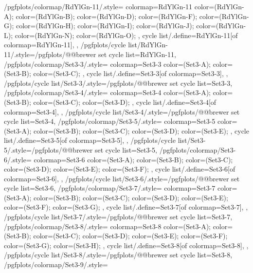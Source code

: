 {  %
  /pgfplots/colormap/RdYlGn-11/.style={
    colormap={RdYlGn-11}{
      color=(RdYlGn-A);
      color=(RdYlGn-B);
      color=(RdYlGn-D);
      color=(RdYlGn-F);
      color=(RdYlGn-G);
      color=(RdYlGn-H);
      color=(RdYlGn-I);
      color=(RdYlGn-J);
      color=(RdYlGn-L);
      color=(RdYlGn-N);
      color=(RdYlGn-O);
    },
    cycle list/.define={RdYlGn-11}{[of colormap=RdYlGn-11]},
  },
  /pgfplots/cycle list/RdYlGn-11/.style={/pgfplots/@@brewer set cycle list={RdYlGn-11}},
  /pgfplots/colormap/Set3-3/.style={
    colormap={Set3-3}{
      color=(Set3-A);
      color=(Set3-B);
      color=(Set3-C);
    },
    cycle list/.define={Set3-3}{[of colormap=Set3-3]},
  },
  /pgfplots/cycle list/Set3-3/.style={/pgfplots/@@brewer set cycle list={Set3-3}},
  /pgfplots/colormap/Set3-4/.style={
    colormap={Set3-4}{
      color=(Set3-A);
      color=(Set3-B);
      color=(Set3-C);
      color=(Set3-D);
    },
    cycle list/.define={Set3-4}{[of colormap=Set3-4]},
  },
  /pgfplots/cycle list/Set3-4/.style={/pgfplots/@@brewer set cycle list={Set3-4}},
  /pgfplots/colormap/Set3-5/.style={
    colormap={Set3-5}{
      color=(Set3-A);
      color=(Set3-B);
      color=(Set3-C);
      color=(Set3-D);
      color=(Set3-E);
    },
    cycle list/.define={Set3-5}{[of colormap=Set3-5]},
  },
  /pgfplots/cycle list/Set3-5/.style={/pgfplots/@@brewer set cycle list={Set3-5}},
  /pgfplots/colormap/Set3-6/.style={
    colormap={Set3-6}{
      color=(Set3-A);
      color=(Set3-B);
      color=(Set3-C);
      color=(Set3-D);
      color=(Set3-E);
      color=(Set3-F);
    },
    cycle list/.define={Set3-6}{[of colormap=Set3-6]},
  },
  /pgfplots/cycle list/Set3-6/.style={/pgfplots/@@brewer set cycle list={Set3-6}},
  /pgfplots/colormap/Set3-7/.style={
    colormap={Set3-7}{
      color=(Set3-A);
      color=(Set3-B);
      color=(Set3-C);
      color=(Set3-D);
      color=(Set3-E);
      color=(Set3-F);
      color=(Set3-G);
    },
    cycle list/.define={Set3-7}{[of colormap=Set3-7]},
  },
  /pgfplots/cycle list/Set3-7/.style={/pgfplots/@@brewer set cycle list={Set3-7}},
  /pgfplots/colormap/Set3-8/.style={
    colormap={Set3-8}{
      color=(Set3-A);
      color=(Set3-B);
      color=(Set3-C);
      color=(Set3-D);
      color=(Set3-E);
      color=(Set3-F);
      color=(Set3-G);
      color=(Set3-H);
    },
    cycle list/.define={Set3-8}{[of colormap=Set3-8]},
  },
  /pgfplots/cycle list/Set3-8/.style={/pgfplots/@@brewer set cycle list={Set3-8}},
  /pgfplots/colormap/Set3-9/.style={
}}
